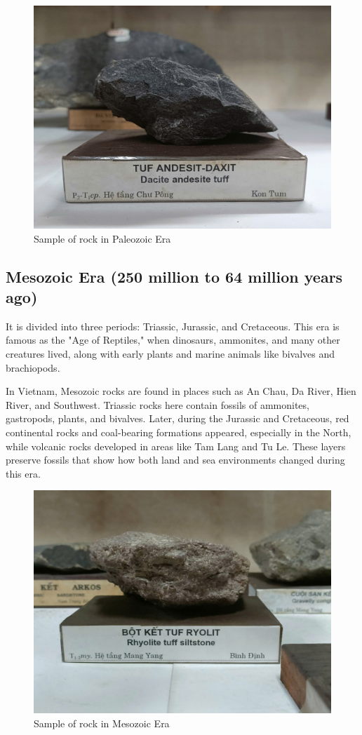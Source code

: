 \begin{figure}[H]
  \centering
  \includegraphics[max width=0.8\linewidth]{graphics/figure_04.jpg}
  \caption{Sample of rock in Paleozoic Era}
  \label{fig:paleozoic-rock}
\end{figure}

\subsection{Mesozoic Era (250 million to 64 million years ago)}
\label{subsec:mesozoic}

It is divided into three periods: Triassic, Jurassic, and Cretaceous. This era is famous as the "Age of Reptiles," when dinosaurs, ammonites, and many other creatures lived, along with early plants and marine animals like bivalves and brachiopods.

In Vietnam, Mesozoic rocks are found in places such as An Chau, Da River, Hien River, and Southwest. Triassic rocks here contain fossils of ammonites, gastropods, plants, and bivalves. Later, during the Jurassic and Cretaceous, red continental rocks and coal-bearing formations appeared, especially in the North, while volcanic rocks developed in areas like Tam Lang and Tu Le. These layers preserve fossils that show how both land and sea environments changed during this era.

\begin{figure}[H]
  \centering
  \includegraphics[max width=0.8\linewidth]{graphics/figure_05.jpg}
  \caption{Sample of rock in Mesozoic Era}
  \label{fig:mesozoic-rock}
\end{figure}

